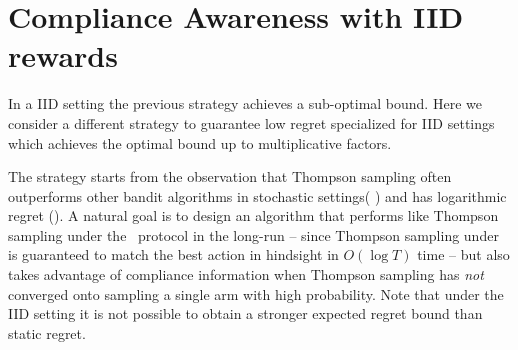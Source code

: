 
%
%
%
%
%


\section{Compliance Awareness with IID rewards}


In a IID setting the previous strategy achieves a sub-optimal bound.
Here we consider a different strategy to guarantee low regret specialized for IID settings which achieves the optimal bound up to multiplicative factors. 



The strategy starts from the observation that Thompson sampling often outperforms other bandit algorithms in stochastic settings( \cite{thompson:33, chapelle:11}) and has logarithmic regret (\cite{agrawal:12, kaufmann:12}). A natural goal is to design an algorithm that performs like Thompson sampling under the \chosen\, protocol in the long-run -- since Thompson sampling under \chosen\, is guaranteed to match the best action in hindsight in $O(\log T)$ time -- but also takes advantage of compliance information when Thompson sampling has \emph{not} converged onto sampling a single arm with high probability. Note that under the IID setting it is not possible to obtain a stronger expected regret bound than static regret. 

